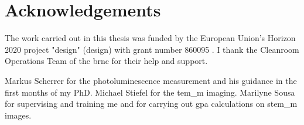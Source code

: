 \chapter{Acknowledgements}

The work carried out in this thesis was funded by the European Union's Horizon 2020 project "\acl{design}" (\acs{design}) with grant number 860095 \cite{CordisDESIGN}. I thank the Cleanroom Operations Team of the \acl{brnc} for their help and support. 

Markus Scherrer for the photoluminescence measurement and his guidance in the first months of my PhD. 
Michael Stiefel for the \acs{tem_m} imaging. Marilyne Sousa for supervising and training me and for carrying out \acs{gpa} calculations on \acs{stem_m} images.